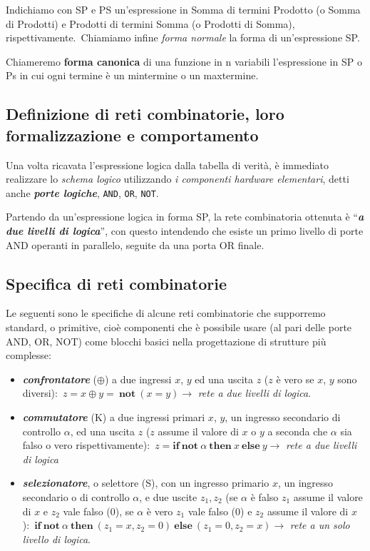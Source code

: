 Indichiamo con SP e PS un'espressione in Somma di termini Prodotto (o Somma di Prodotti) e Prodotti di termini Somma (o Prodotti di Somma), rispettivamente.\
Chiamiamo infine \textit{forma normale} la forma di un'espressione SP.

Chiameremo \textbf{forma canonica} di una funzione in n variabili l'espressione in SP o Ps in cui ogni termine è un mintermine o un maxtermine.

\subsection{Definizione di reti combinatorie, loro formalizzazione e comportamento}

Una volta ricavata l'espressione logica dalla tabella di verità, è immediato realizzare lo \textit{schema logico} utilizzando \textit{i componenti hardware elementari}, detti anche \textbf{\textit{porte logiche}}, \texttt{AND}, \texttt{OR}, \texttt{NOT}.

Partendo da un'espressione logica in forma SP, la rete combinatoria ottenuta è ``\textbf{\textit{a due livelli di logica}}'', con questo intendendo che esiste un primo livello di porte AND operanti in parallelo, seguite da una porta OR finale.

\subsection{Specifica di reti combinatorie}

Le seguenti sono le specifiche di alcune reti combinatorie che supporremo standard, o primitive, cioè componenti che è possibile usare (al pari delle porte AND, OR, NOT) come blocchi basici nella progettazione di strutture più complesse:

\begin{itemize}
    \item \textbf{\textit{confrontatore}} ($\oplus$) a due ingressi $x$, $y$ ed una uscita $z$ ($z$ è vero se $x$, $y$ sono diversi):\ $z= x \oplus y =\ \mathbf{not}\ (x=y) \rightarrow$ \textit{rete a due livelli di logica}.
    \item \textbf{\textit{commutatore}} (K) a due ingressi primari $x$, $y$, un ingresso secondario di controllo $\alpha$, ed una uscita $z$ ($z$ assume il valore di $x$ o $y$ a seconda che $\alpha$ sia falso o vero rispettivamente):\ $z = \mathbf{if\ not}\ \alpha\ \mathbf{then}\ x\ \mathbf{else}\ y \rightarrow$ \textit{rete a due livelli di logica}
    \item \textbf{\textit{selezionatore}}, o selettore (S), con un ingresso primario $x$, un ingresso secondario o di controllo $\alpha$, e due uscite $z_1, z_2$ (se $\alpha$ è falso $z_1$ assume il valore di $x$ e $z_2$ vale falso (0), se $\alpha$ è vero $z_1$ vale falso (0) e $z_2$ assume il valore di $x$):\ $\mathbf{if\ not}\ \alpha\ \mathbf{then}\ (z_1 = x, z_2 = 0)\ \mathbf{else}\ (z_1 = 0, z_2 = x)  \rightarrow$ \textit{rete a un solo livello di logica}.
\end{itemize}

